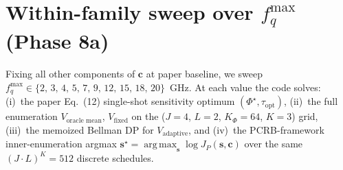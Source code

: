 \documentclass[11pt,a4paper]{article}
\newcommand{\argmax}{\operatorname*{arg\,max}}
\begin{document}
\section{Within-family sweep over $f_q^{\max}$ (Phase 8a)}
\label{sec:fq_sweep}

Fixing all other components of $\bm c$ at paper baseline, we sweep $f_q^{\max} \in \{2,\,3,\,4,\,5,\,7,\,9,\,12,\,15,\,18,\,20\}$~GHz.  At each value the code solves: (i)~the paper Eq.~(12) single-shot sensitivity optimum $(\Phi^\star, \tau_{\text{opt}})$, (ii)~the full enumeration $V_{\text{oracle\ mean}}$, $V_{\text{fixed}}$ on the ($J=4$, $L=2$, $K_\Phi=64$, $K=3$) grid, (iii)~the memoized Bellman DP for $V_{\text{adaptive}}$, and (iv)~the PCRB-framework inner-enumeration argmax $\bm s^\star = \argmax_{\bm s}\log J_P(\bm s, \bm c)$ over the same $(J\cdot L)^K = 512$ discrete schedules.
\end{document}
